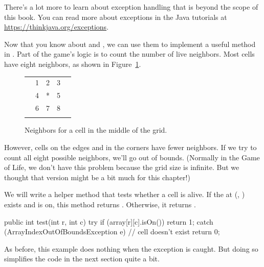 There's a lot more to learn about exception handling that is beyond the scope of this book.
You can read more about exceptions in the Java tutorials at \url{https://thinkjava.org/exceptions}.


Now that you know about  and , we can use them to implement a useful method in .
Part of the game's logic is to count the number of live neighbors.
Most cells have eight neighbors, as shown in Figure~\ref{fig:neighbors}.

\begin{figure}[!ht]
\begin{center}
\begin{tabular}{|p{1em}|p{1em}|p{1em}|p{1em}|p{1em}|}
\hline
  &   &   &   &   \\
\hline
  & 1 & 2 & 3 &   \\
\hline
  & 4 & * & 5 &   \\
\hline
  & 6 & 7 & 8 &   \\
\hline
  &   &   &   &   \\
\hline
\end{tabular}
\caption{Neighbors for a cell in the middle of the grid.}
\label{fig:neighbors}
\end{center}
\end{figure}

However, cells on the edges and in the corners have fewer neighbors.
If we try to count all eight possible neighbors, we'll go out of bounds.
(Normally in the Game of Life, we don't have this problem because the grid size is infinite.
But we thought that version might be a bit much for this chapter!)

We will write a helper method that tests whether a cell is alive.
If the  at (, ) exists and is on, this method returns .
Otherwise, it returns .

\begin{code}
public int test(int r, int c) {
    try {
        if (array[r][c].isOn()) {
            return 1;
        }
    } catch (ArrayIndexOutOfBoundsException e) {
        // cell doesn't exist
    }
    return 0;
}
\end{code}

As before, this example does nothing when the exception is caught.
But doing so simplifies the code in the next section quite a bit.


